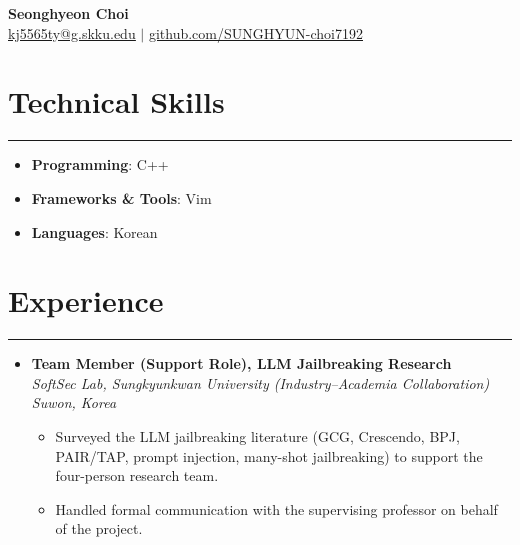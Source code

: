 \documentclass[letterpaper, 10pt]{article}
\begin{document}
\begin{center}
    \textbf{\LARGE Seonghyeon Choi} \\ \vspace{2pt}
    \href{mailto:kj5565ty@g.skku.edu}{\underline{kj5565ty@g.skku.edu}} $|$
    \href{https://github.com/SUNGHYUN-choi7192}{\underline{github.com/SUNGHYUN-choi7192}}
\end{center}

\section*{Technical Skills}
\hrule
\vspace{4pt}
\begin{itemize}
    \item[] \textbf{Programming}: C++
    \item[] \textbf{Frameworks \& Tools}: Vim
    \item[] \textbf{Languages}: Korean
\end{itemize}

\section*{Experience}
\hrule
\vspace{4pt}
\begin{itemize}
    \item[]
        \textbf{Team Member (Support Role), LLM Jailbreaking Research} \hfill  \\
        \textit{SoftSec Lab, Sungkyunkwan University (Industry--Academia Collaboration)} \hfill \textit{Suwon, Korea}
        \begin{itemize}
            \item Surveyed the LLM jailbreaking literature (GCG, Crescendo, BPJ, PAIR/TAP, prompt injection, many-shot jailbreaking) to support the four-person research team.
            \item Handled formal communication with the supervising professor on behalf of the project.
        \end{itemize}
\end{itemize}
\end{document}
